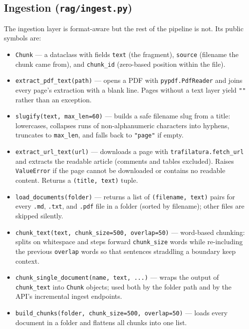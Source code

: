 \documentclass[11pt,a4paper]{article}
\newcommand{\code}[1]{\texttt{#1}}
\begin{document}
\subsection{Ingestion (\code{rag/ingest.py})}
The ingestion layer is format-aware but the rest of the pipeline is not. Its
public symbols are:

\begin{itemize}
  \item \code{Chunk} --- a dataclass with fields \code{text} (the fragment),
        \code{source} (filename the chunk came from), and \code{chunk\_id}
        (zero-based position within the file).
  \item \code{extract\_pdf\_text(path)} --- opens a PDF with
        \texttt{pypdf.PdfReader} and joins every page's extraction with a
        blank line. Pages without a text layer yield \code{""} rather than an
        exception.
  \item \code{slugify(text, max\_len=60)} --- builds a safe filename slug
        from a title: lowercases, collapses runs of non-alphanumeric
        characters into hyphens, truncates to \code{max\_len}, and falls
        back to \code{"page"} if empty.
  \item \code{extract\_url\_text(url)} --- downloads a page with
        \texttt{trafilatura.fetch\_url} and extracts the readable article
        (comments and tables excluded). Raises \code{ValueError} if the page
        cannot be downloaded or contains no readable content. Returns a
        \code{(title, text)} tuple.
  \item \code{load\_documents(folder)} --- returns a list of
        \code{(filename, text)} pairs for every \code{.md}, \code{.txt}, and
        \code{.pdf} file in a folder (sorted by filename); other files are
        skipped silently.
  \item \code{chunk\_text(text, chunk\_size=500, overlap=50)} --- word-based
        chunking: splits on whitespace and steps forward \code{chunk\_size}
        words while re-including the previous \code{overlap} words so that
        sentences straddling a boundary keep context.
  \item \code{chunk\_single\_document(name, text, ...)} --- wraps the output
        of \code{chunk\_text} into \code{Chunk} objects; used both by the
        folder path and by the API's incremental ingest endpoints.
  \item \code{build\_chunks(folder, chunk\_size=500, overlap=50)} --- loads
        every document in a folder and flattens all chunks into one list.
\end{itemize}
\end{document}
